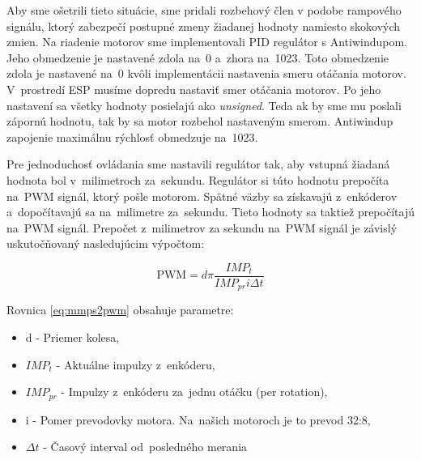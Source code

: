 Aby sme ošetrili tieto situácie, sme pridali rozbehový člen v podobe rampového signálu, ktorý zabezpečí postupné zmeny žiadanej hodnoty namiesto skokových zmien. Na riadenie motorov sme implementovali PID regulátor s Antiwindupom. 
Jeho obmedzenie je nastavené zdola na~0 a~zhora na~1023. Toto obmedzenie zdola je nastavené na~0 kvôli implementácii nastavenia smeru
otáčania motorov. V~prostredí ESP musíme dopredu nastaviť smer otáčania motorov. Po jeho nastavení sa všetky hodnoty
posielajú ako \textit{unsigned}. Teda ak by sme mu poslali zápornú hodnotu, tak by sa motor rozbehol nastaveným smerom.
Antiwindup zapojenie maximálnu rýchlosť obmedzuje na~1023.

Pre jednoduchosť ovládania sme nastavili regulátor tak, aby vstupná žiadaná hodnota bol v~milimetroch za~sekundu.
Regulátor si túto hodnotu prepočíta na~PWM signál, ktorý pošle motorom. Spätné väzby sa získavajú z~enkóderov
a~dopočítavajú sa na~milimetre za~sekundu. Tieto hodnoty sa taktiež prepočítajú na~PWM signál. Prepočet z~milimetrov
za sekundu na~PWM signál je závislý uskutočňovaný nasledujúcim výpočtom:

\begin{equation}
	\text{PWM} = d \pi \frac{IMP_t}{IMP_{pr} i \Delta t}
	\label{eq:mmps2pwm}
\end{equation}

Rovnica \ref{eq:mmps2pwm} obsahuje parametre:
\begin{itemize}
	\item d - Priemer kolesa,
	\item $IMP_t$ - Aktuálne impulzy z~enkóderu,
	\item $IMP_{pr}$ - Impulzy z~enkóderu za~jednu otáčku (per rotation),
	\item i - Pomer prevodovky motora. Na~našich motoroch je to prevod 32:8,
	\item $\Delta t$ - Časový interval od~posledného merania
\end{itemize}

\newpage
